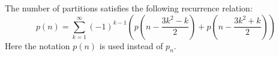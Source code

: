 

\setcounter{section}{3}
\setcounter{subsection}{7}
\setcounter{dfn}{18}

\begin{thm}
The number of partitions satisfies the following recurrence relation:
\[
p(n) =  \sum_{k=1}^\infty (-1)^{k-1} \left(p\left(n - \frac{3k^2 - k}{2}\right) + p\left(n - \frac{3k^2 + k}{2}\right)\right)
\]
Here the notation $p(n)$ is used instead of $p_n$.
\end{thm}


